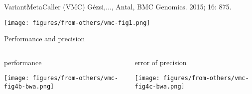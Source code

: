 \documentclass{beamer} %
\begin{document}
\begin{frame}{VariantMetaCaller (VMC)}
{G\'{e}zsi,..., Antal, BMC Genomics. 2015; 16: 875.}

\texttt{[image: figures/from-others/vmc-fig1.png]}
\end{frame}

\begin{frame}{Performance and precision}
\begin{columns}[t]
\begin{column}{0.5\textwidth}
performance

\texttt{[image: figures/from-others/vmc-fig4b-bwa.png]}
\end{column}

\begin{column}{0.5\textwidth}
error of precision

\texttt{[image: figures/from-others/vmc-fig4c-bwa.png]}
\end{column}
\end{columns}
\end{frame}

%
%
%
\end{document}
